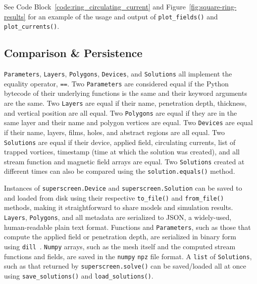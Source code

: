\documentclass[final,3p,times]{elsarticle}
\newcommand{\inline}[1]{\texttt{#1}\xspace}
\begin{document}
See Code Block~\ref{code:ring_circulating_current} and  Figure~\ref{fig:square-ring-results} for an example of the usage and output of \inline{plot_fields()} and \inline{plot_currents()}.

\subsection{Comparison \& Persistence}
\label{section:overview:persistence}

\inline{Parameters}, \inline{Layers}, \inline{Polygons}, \inline{Devices}, and \inline{Solutions} all implement the equality operator, \inline{==}. Two \inline{Parameters} are considered equal if the Python bytecode of their underlying functions is the same and their keyword arguments are the same. Two \inline{Layers} are equal if their name, penetration depth, thickness, and vertical position are all equal. Two \inline{Polygons} are equal if they are in the same layer and their name and polygon vertices are equal. Two \inline{Devices} are equal if their name, layers, films, holes, and abstract regions are all equal. Two \inline{Solutions} are equal if their device, applied field, circulating currents, list of trapped vortices, timestamp (time at which the solution was created), and all stream function and magnetic field arrays are equal. Two \inline{Solutions} created at different times can also be compared using the  \inline{solution.equals()} method.

Instances of \inline{superscreen.Device} and \inline{superscreen.Solution} can be saved to and loaded from disk using their respective \inline{to_file()} and \inline{from_file()} methods, making it straightforward to share models and simulation results. \inline{Layers}, \inline{Polygons}, and all metadata are serialized to JSON, a widely-used, human-readable plain text format. Functions and \inline{Parameters}, such as those that compute the applied field or penetration depth, are serialized in binary form using \inline{dill}~\cite{McKerns}. \inline{Numpy} arrays, such as the mesh itself and the computed stream functions and fields, are saved in the \inline{numpy} \inline{npz} file format. A \inline{list} of \inline{Solutions}, such as that returned by \inline{superscreen.solve()} can be saved/loaded all at once using \inline{save_solutions()} and \inline{load_solutions()}.
\end{document}
